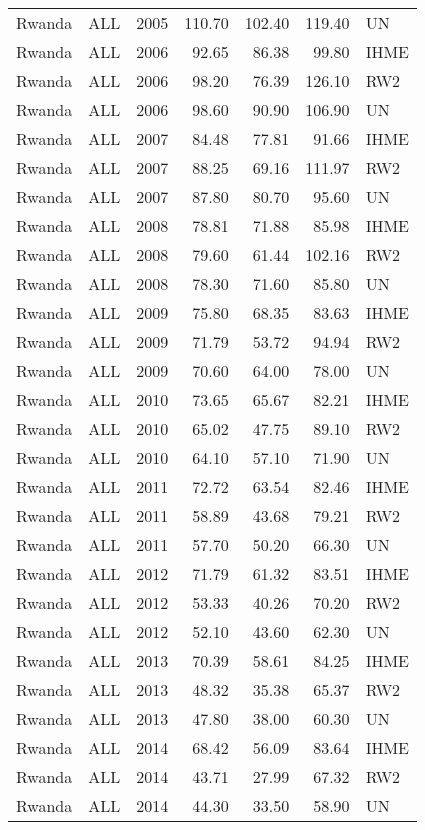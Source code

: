 \begin{longtable}{lllrrrl}
  Rwanda & ALL & 2005 & 110.70 & 102.40 & 119.40 & UN \\ 
  Rwanda & ALL & 2006 & 92.65 & 86.38 & 99.80 & IHME \\ 
  Rwanda & ALL & 2006 & 98.20 & 76.39 & 126.10 & RW2 \\ 
  Rwanda & ALL & 2006 & 98.60 & 90.90 & 106.90 & UN \\ 
  Rwanda & ALL & 2007 & 84.48 & 77.81 & 91.66 & IHME \\ 
  Rwanda & ALL & 2007 & 88.25 & 69.16 & 111.97 & RW2 \\ 
  Rwanda & ALL & 2007 & 87.80 & 80.70 & 95.60 & UN \\ 
  Rwanda & ALL & 2008 & 78.81 & 71.88 & 85.98 & IHME \\ 
  Rwanda & ALL & 2008 & 79.60 & 61.44 & 102.16 & RW2 \\ 
  Rwanda & ALL & 2008 & 78.30 & 71.60 & 85.80 & UN \\ 
  Rwanda & ALL & 2009 & 75.80 & 68.35 & 83.63 & IHME \\ 
  Rwanda & ALL & 2009 & 71.79 & 53.72 & 94.94 & RW2 \\ 
  Rwanda & ALL & 2009 & 70.60 & 64.00 & 78.00 & UN \\ 
  Rwanda & ALL & 2010 & 73.65 & 65.67 & 82.21 & IHME \\ 
  Rwanda & ALL & 2010 & 65.02 & 47.75 & 89.10 & RW2 \\ 
  Rwanda & ALL & 2010 & 64.10 & 57.10 & 71.90 & UN \\ 
  Rwanda & ALL & 2011 & 72.72 & 63.54 & 82.46 & IHME \\ 
  Rwanda & ALL & 2011 & 58.89 & 43.68 & 79.21 & RW2 \\ 
  Rwanda & ALL & 2011 & 57.70 & 50.20 & 66.30 & UN \\ 
  Rwanda & ALL & 2012 & 71.79 & 61.32 & 83.51 & IHME \\ 
  Rwanda & ALL & 2012 & 53.33 & 40.26 & 70.20 & RW2 \\ 
  Rwanda & ALL & 2012 & 52.10 & 43.60 & 62.30 & UN \\ 
  Rwanda & ALL & 2013 & 70.39 & 58.61 & 84.25 & IHME \\ 
  Rwanda & ALL & 2013 & 48.32 & 35.38 & 65.37 & RW2 \\ 
  Rwanda & ALL & 2013 & 47.80 & 38.00 & 60.30 & UN \\ 
  Rwanda & ALL & 2014 & 68.42 & 56.09 & 83.64 & IHME \\ 
  Rwanda & ALL & 2014 & 43.71 & 27.99 & 67.32 & RW2 \\ 
  Rwanda & ALL & 2014 & 44.30 & 33.50 & 58.90 & UN \\ 

\end{longtable}

